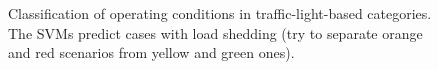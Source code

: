 \begin{figure}
{
}
\caption{Classification of operating conditions in traffic-light-based categories. The SVMs predict cases with load shedding (\ie try to separate orange and red scenarios from yellow and green ones).}
\label{fig:cascade_value}
\end{figure}

%




